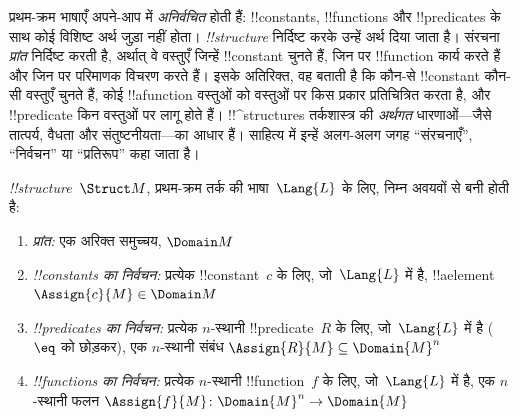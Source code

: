 \documentclass[../../../include/open-logic-section]{subfiles}
\begin{document}


\begin{explain}
प्रथम-क्रम भाषाएँ अपने-आप में \emph{अनिर्वचित} होती हैं: !!{constant}s,
!!{function}s और !!{predicate}s के साथ कोई विशिष्ट अर्थ जुड़ा नहीं होता।
 \emph{!!{structure}} निर्दिष्ट करके उन्हें अर्थ दिया
जाता है। संरचना \emph{प्रांत} निर्दिष्ट करती है, अर्थात् वे वस्तुएँ जिन्हें
!!{constant} चुनते हैं, जिन पर !!{function} कार्य करते हैं और जिन पर
परिमाणक विचरण करते हैं। इसके अतिरिक्त, वह बताती है कि कौन-से !!{constant}
कौन-सी वस्तुएँ चुनते हैं, कोई !!a{function} वस्तुओं को वस्तुओं पर किस प्रकार
प्रतिचित्रित करता है, और !!{predicate} किन वस्तुओं पर लागू होते हैं।
!!^{structure}s तर्कशास्त्र की \emph{अर्थगत} धारणाओं---जैसे तात्पर्य, वैधता और
संतुष्टनीयता---का आधार हैं। साहित्य में इन्हें अलग-अलग जगह ``संरचनाएँ'',
``निर्वचन'' या ``प्रतिरूप'' कहा जाता है।
\end{explain}

\begin{defn}[!!^{structure}s]
 \emph{!!{structure}}~$\Struct M$, प्रथम-क्रम तर्क की
भाषा~$\Lang{L}$ के लिए, निम्न अवयवों से बनी होती है:
\begin{enumerate}
\item \emph{प्रांत:} एक अरिक्त समुच्चय, $\Domain M$
\item \emph{!!{constant}s का निर्वचन:} प्रत्येक !!{constant}~$c$ के लिए,
  जो~$\Lang{L}$ में है, !!a{element} $\Assign{c}{M} \in \Domain M$
\item \emph{!!{predicate}s का निर्वचन:} प्रत्येक $n$-स्थानी
  !!{predicate}~$R$ के लिए, जो~$\Lang{L}$ में है ($\eq$ को छोड़कर), एक
  $n$-स्थानी संबंध
  $\Assign{R}{M} \subseteq \Domain{M}^n$
\item \emph{!!{function}s का निर्वचन:} प्रत्येक $n$-स्थानी
  !!{function}~$f$ के लिए, जो~$\Lang{L}$ में है, एक $n$-स्थानी फलन
  $\Assign{f}{M}
  \colon \Domain{M}^n \to \Domain{M}$
\end{enumerate}
\end{defn}
\end{document}
